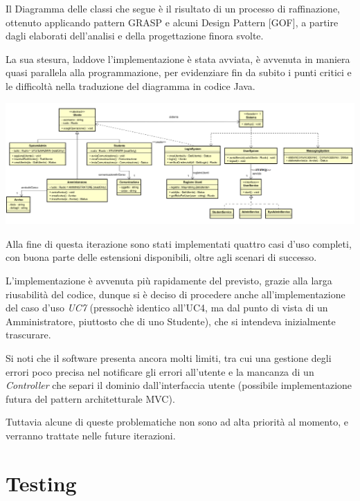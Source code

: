 \documentclass[12pt]{report}
\begin{document}
	Il Diagramma delle classi che segue è il risultato di un processo di raffinazione, ottenuto applicando pattern GRASP e alcuni Design Pattern [GOF], a partire dagli elaborati dell'analisi e della progettazione finora svolte.
	
	La sua stesura, laddove l'implementazione è stata avviata, è avvenuta in maniera quasi parallela alla programmazione, per evidenziare fin da subito i punti critici e le difficoltà nella traduzione del diagramma in codice Java.	
	
	\begin{center}
				\includegraphics[scale= 0.6]{./images/DCD-I2.png}
	\end{center}

	Alla fine di questa iterazione sono stati implementati quattro casi d'uso completi, con buona parte delle estensioni disponibili, oltre agli scenari di successo.
	
	L'implementazione è avvenuta più rapidamente del previsto, grazie alla larga riusabilità del codice, dunque si è deciso di procedere anche all'implementazione del caso d'uso \textit{UC7} (pressochè identico all'UC4, ma dal punto di vista di un Amministratore, piuttosto che di uno Studente), che si intendeva inizialmente trascurare.
	
	Si noti che il software presenta ancora molti limiti, tra cui una gestione degli errori poco precisa nel notificare gli errori all'utente e la mancanza di un \textit{Controller} che separi il dominio dall'interfaccia utente (possibile implementazione futura del pattern architetturale MVC).
	
	Tuttavia alcune di queste problematiche non sono ad alta priorità al momento, e verranno trattate nelle future iterazioni.

	\newpage
	
	
	\section{Testing}
	
\end{document}
